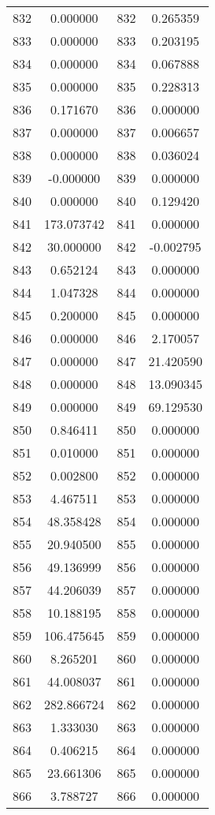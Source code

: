 \documentclass[12pt]{article}
\begin{document}
\begin{longtable}{@{}cccc@{}}
832 & 0.000000 & 832 & 0.265359 \\
833 & 0.000000 & 833 & 0.203195 \\
834 & 0.000000 & 834 & 0.067888 \\
835 & 0.000000 & 835 & 0.228313 \\
836 & 0.171670 & 836 & 0.000000 \\
837 & 0.000000 & 837 & 0.006657 \\
838 & 0.000000 & 838 & 0.036024 \\
839 & -0.000000 & 839 & 0.000000 \\
840 & 0.000000 & 840 & 0.129420 \\
841 & 173.073742 & 841 & 0.000000 \\
842 & 30.000000 & 842 & -0.002795 \\
843 & 0.652124 & 843 & 0.000000 \\
844 & 1.047328 & 844 & 0.000000 \\
845 & 0.200000 & 845 & 0.000000 \\
846 & 0.000000 & 846 & 2.170057 \\
847 & 0.000000 & 847 & 21.420590 \\
848 & 0.000000 & 848 & 13.090345 \\
849 & 0.000000 & 849 & 69.129530 \\
850 & 0.846411 & 850 & 0.000000 \\
851 & 0.010000 & 851 & 0.000000 \\
852 & 0.002800 & 852 & 0.000000 \\
853 & 4.467511 & 853 & 0.000000 \\
854 & 48.358428 & 854 & 0.000000 \\
855 & 20.940500 & 855 & 0.000000 \\
856 & 49.136999 & 856 & 0.000000 \\
857 & 44.206039 & 857 & 0.000000 \\
858 & 10.188195 & 858 & 0.000000 \\
859 & 106.475645 & 859 & 0.000000 \\
860 & 8.265201 & 860 & 0.000000 \\
861 & 44.008037 & 861 & 0.000000 \\
862 & 282.866724 & 862 & 0.000000 \\
863 & 1.333030 & 863 & 0.000000 \\
864 & 0.406215 & 864 & 0.000000 \\
865 & 23.661306 & 865 & 0.000000 \\
866 & 3.788727 & 866 & 0.000000 \\

\end{longtable}
\end{document}
